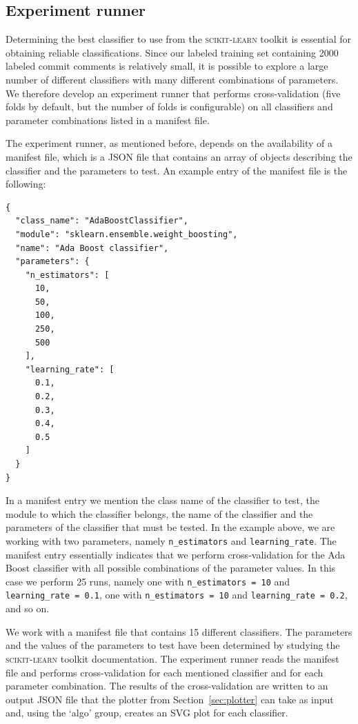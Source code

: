 \documentclass{article}
\begin{document}
\subsection{Experiment runner}\label{sec:experiment-runner}
Determining the best classifier to use from the \textsc{scikit-learn} toolkit is
essential for obtaining reliable classifications. Since our labeled training
set containing 2000 labeled commit comments is relatively small, it is possible
to explore a large number of different classifiers with many different
combinations of parameters. We therefore develop an experiment runner that
performs cross-validation (five folds by default, but the number of folds is
configurable) on all classifiers and parameter combinations listed in a
manifest file.

The experiment runner, as mentioned before, depends on the availability of
a manifest file, which is a JSON file that contains an array of objects
describing the classifier and the parameters to test. An example entry
of the manifest file is the following:

\begin{verbatim}
{
  "class_name": "AdaBoostClassifier",
  "module": "sklearn.ensemble.weight_boosting",
  "name": "Ada Boost classifier",
  "parameters": {
    "n_estimators": [
      10,
      50,
      100,
      250,
      500
    ],
    "learning_rate": [
      0.1,
      0.2,
      0.3,
      0.4,
      0.5
    ]
  }
}
\end{verbatim}

In a manifest entry we mention the class name of the classifier to test, the
module to which the classifier belongs, the name of the classifier and the
parameters of the classifier that must be tested. In the example above, we are
working with two parameters, namely {\tt n\_estimators} and
{\tt learning\_rate}. The manifest entry essentially indicates that we perform
cross-validation for the Ada Boost classifier with all possible combinations
of the parameter values. In this case we perform 25 runs, namely one with
{\tt n\_estimators = 10} and {\tt learning\_rate = 0.1}, one with
{\tt n\_estimators = 10} and {\tt learning\_rate = 0.2}, and so on.

We work with a manifest file that contains 15 different classifiers. The
parameters and the values of the parameters to test have been determined by
studying the \textsc{scikit-learn} toolkit documentation. The experiment runner
reads the manifest file and performs cross-validation for each mentioned
classifier and for each parameter combination. The results of the
cross-validation are written to an output JSON file that the plotter from
Section~\ref{sec:plotter} can take as input and, using the `algo' group,
creates an SVG plot for each classifier.
\end{document}
